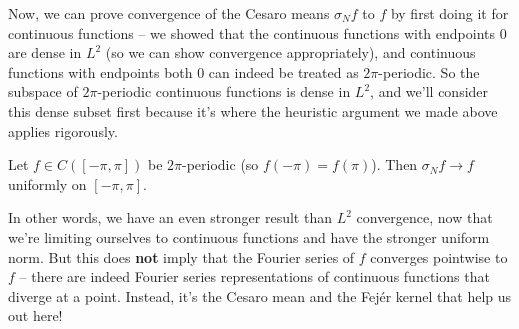 Now, we can prove convergence of the Cesaro means $\sigma_N f$ to $f$ by first doing it for continuous functions -- we showed that the continuous functions with endpoints $0$ are dense in $L^2$ (so we can show convergence appropriately), and continuous functions with endpoints both $0$ can indeed be treated as $2\pi$-periodic. So the subspace of $2\pi$-periodic continuous functions is dense in $L^2$, and we'll consider this dense subset first because it's where the heuristic argument we made above applies rigorously.

\begin{theorem}[Fej\'er]
Let $f \in C([-\pi, \pi])$ be $2\pi$-periodic (so $f(-\pi) = f(\pi)$). Then $\sigma_N f \to f$ uniformly on $[-\pi, \pi]$.
\end{theorem}

In other words, we have an even stronger result than $L^2$ convergence, now that we're limiting ourselves to continuous functions and have the stronger uniform norm. But this does \textbf{not} imply that the Fourier series of $f$ converges pointwise to $f$ -- there are indeed Fourier series representations of continuous functions that diverge at a point. Instead, it's the Cesaro mean and the Fej\'er kernel that help us out here!

